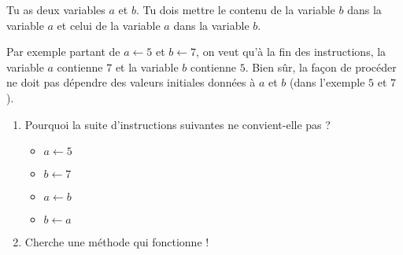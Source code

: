 \documentclass[class=report,crop=false, 12pt]{standalone}
\begin{document}
\begin{activite}
Tu as deux variables $a$ et $b$. Tu dois mettre le contenu de la variable $b$ dans la variable $a$ et celui de la variable $a$ dans la variable $b$.

Par exemple partant de $a \leftarrow 5$ et $b \leftarrow 7$, on veut qu'à la fin des instructions, la variable $a$ contienne $7$ et la variable $b$ contienne $5$. Bien sûr, la façon de procéder ne doit pas dépendre des valeurs initiales données à $a$ et $b$ (dans l'exemple $5$ et $7$).

\begin{enumerate}
  \item Pourquoi la suite d'instructions suivantes ne convient-elle pas ?
\begin{itemize}
  \item $a \leftarrow 5$
  \item $b \leftarrow 7$
  \item $a \leftarrow b$ 
  \item $b \leftarrow a$ 
\end{itemize}
  
  \item Cherche une méthode qui fonctionne !
\end{enumerate}
\end{activite}
\end{document}
